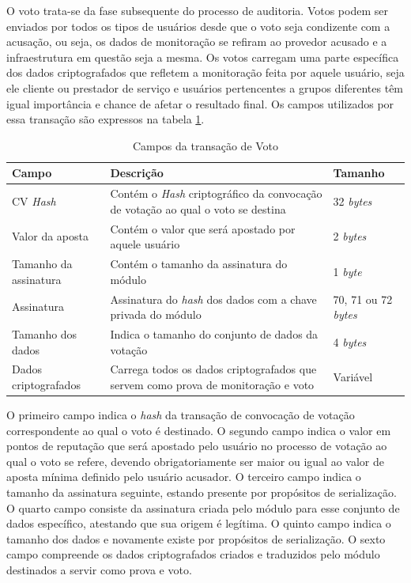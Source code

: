 O voto trata-se da fase subsequente do processo de auditoria. Votos podem ser enviados por todos os tipos de usuários desde que o voto seja condizente com a acusação, ou seja, os dados de monitoração se refiram ao provedor acusado e a infraestrutura em questão seja a mesma. Os votos carregam uma parte específica dos dados criptografados que refletem a monitoração feita por aquele usuário, seja ele cliente ou prestador de serviço e usuários pertencentes a grupos diferentes têm igual importância e chance de afetar o resultado final. Os campos utilizados por essa transação são expressos na tabela \ref{tabela:voto}.

\begin{table}[ht]
\centering
    \begin{tabular}{|m{}|m{}|m{}|}
    \hline
         \textbf{Campo} & \textbf{Descrição} & \textbf{Tamanho}  \\
         \hline
         \ac{CV} \textit{Hash} & Contém o \textit{Hash} criptográfico da convocação de votação ao qual o voto se destina & 32 \textit{bytes} \\
         \hline
         Valor da aposta & Contém o valor que será apostado por aquele usuário & 2 \textit{bytes} \\
         \hline
         Tamanho da assinatura & Contém o tamanho da assinatura do módulo & 1 \textit{byte} \\
         \hline
         Assinatura & Assinatura do \textit{hash} dos dados com a chave privada do módulo & 70, 71 ou 72 \textit{bytes} \\
         \hline
         Tamanho dos dados & Indica o tamanho do conjunto de dados da votação & 4 \textit{bytes} \\
         \hline
         Dados criptografados & Carrega todos os dados criptografados que servem como prova de monitoração e voto & Variável \\
    \hline
    \end{tabular}
    \caption{Campos da transação de Voto}
    \label{tabela:voto}
\end{table}

O primeiro campo indica o \textit{hash} da transação de convocação de votação correspondente ao qual o voto é destinado. O segundo campo indica o valor em pontos de reputação que será apostado pelo usuário no processo de votação ao qual o voto se refere, devendo obrigatoriamente ser maior ou igual ao valor de aposta mínima definido pelo usuário acusador. O terceiro campo indica o tamanho da assinatura seguinte, estando presente por propósitos de serialização. O quarto campo consiste da assinatura criada pelo módulo para esse conjunto de dados específico, atestando que sua origem é legítima. O quinto campo indica o tamanho dos dados e novamente existe por propósitos de serialização. O sexto campo compreende os dados criptografados criados e traduzidos pelo módulo destinados a servir como prova e voto.

